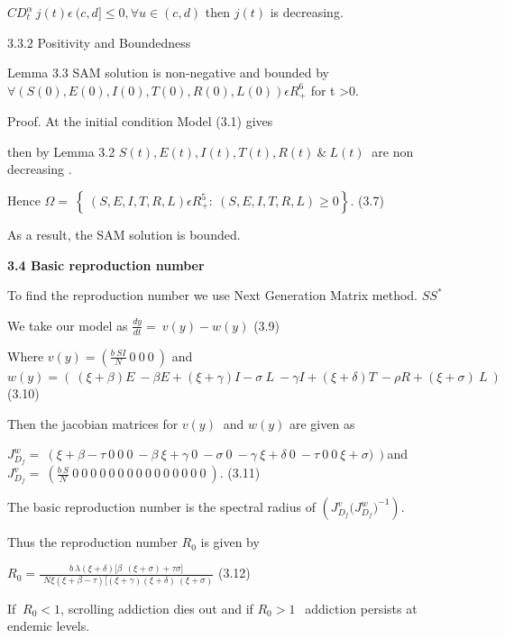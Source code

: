 \documentclass[10pt]{NSP1}
\begin{document}
$CD_{t}^{\alpha}\ j(t)\epsilon\ (c,d\rbrack \leq 0,\forall u \in (c,d)$ then $j(t)$ is decreasing.

3$.3.2$ Positivity and Boundedness

Lemma 3.3 SAM solution is non-negative and bounded by $\forall(S(0),E(0),I(0),T(0),R(0),L(0))\epsilon R_{+}^{6}$ for t \textgreater{}0.

Proof. At the initial condition Model (3.1) gives

then by Lemma 3.2 $S(t),E(t),I(t),T(t),R(t)\ \&\ L(t)\ $ are non decreasing .

Hence $\Omega = \ \left\{ \ (S,E,I,T,R,L)\epsilon R_{+}^{5}:\ (S,E,I,T,R,L) \geq 0 \right\}.$ (3.7)

As a result, the SAM solution is bounded.

\par\vspace{14.0pt}\noindent \begin{center}\large\bfseries 3.4 Basic reproduction number\end{center}\vspace{14.0pt}

To find the reproduction number we use Next Generation Matrix method. $SS^{*}$

We take our model as $\frac{dy}{dt} = \ v(y) - w(y)$ (3.9)

Where $v(y) = \left( \frac{b\ SI}{N}\ 0\ 0\ 0\  \right)$ and $w(y) = \left( \ (\xi + \beta)E\  - \beta E + (\xi + \gamma)I - \sigma\ L\  - \gamma I + (\xi + \delta)T\  - \rho R + (\xi + \sigma)\ L\  \right)$ (3.10)

Then the jacobian matrices for $v(y)\ $ and $w(y)$ are given as

$J_{D_{f}}^{w} = \ \left( \xi + \beta - \tau\ 0\ 0\ 0\  - \beta\ \xi + \gamma\ 0\  - \sigma\ 0\  - \gamma\ \xi + \delta\ 0\  - \tau\ 0\ 0\ \xi + \sigma)\  \right)$and $J_{D_{f}}^{v} = \ \left( \frac{b\ S}{N}\ 0\ 0\ 0\ 0\ 0\ 0\ 0\ 0\ 0\ 0\ 0\ 0\ 0\ 0\ 0\  \right)$. (3.11)

The basic reproduction number is the spectral radius of $\left( J_{D_{f}}^{v}({J_{D_{f}}^{w})}^{- 1} \right)$.

Thus the reproduction number $R_{0}$ is given by

$R_{0} = \frac{b\ \lambda(\xi + \delta)\lbrack\beta\ \ (\xi + \sigma) + \tau\sigma\rbrack}{\ \ N\xi(\xi + \beta - \tau)\lbrack(\xi + \gamma)(\xi + \delta)\ (\xi + \sigma)}$ (3.12)

If $\ R_{0} < 1$, scrolling addiction dies out and if $R_{0} > 1\ \ $ addiction persists at endemic levels.
\end{document}
